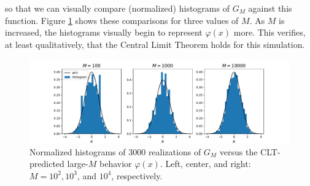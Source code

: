 \documentclass[11pt]{amsart}
\begin{document}
so that we can visually compare (normalized) histograms of $G_M$ against this function. Figure \ref{fig:CLT} shows these comparisons for three values of $M$. As $M$ is increased, the histograms visually begin to represent $\varphi(x)$ more. This verifies, at least qualitatively, that the Central Limit Theorem holds for this simulation.
\begin{figure}
  \begin{center}
    \includegraphics[width=\textwidth]{images/CLT.pdf}
  \end{center}
  \caption{Normalized histograms of 3000 realizations of $G_M$ versus the CLT-predicted large-$M$ behavior $\varphi(x)$. Left, center, and right: $M = 10^2, 10^3$, and $10^4$, respectively.}\label{fig:CLT}
\end{figure}
\end{document}

